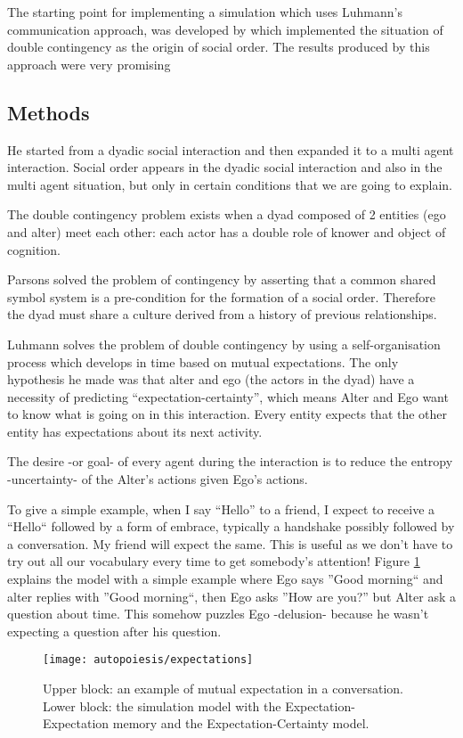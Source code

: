 The starting point for implementing a simulation which uses Luhmann's communication approach, 
was developed by \citet{SocialOrderScalability} which implemented the situation of
double contingency as the origin of social order.
The results produced by this approach were very promising


\subsection{Methods}
He started from a dyadic social interaction and then expanded it to a multi agent interaction.
Social order appears in the dyadic social interaction and also in the multi agent situation,
but only in certain conditions that we are going to explain.

The double contingency problem exists when a dyad composed of 2 entities (ego and alter) meet each other:
each actor has a double role of knower and object of cognition.

Parsons solved the problem of contingency by asserting that a common shared symbol system
is a pre-condition for the formation of a social order.
Therefore the dyad must share a culture derived from a history of previous relationships.

Luhmann solves the problem of double contingency by using a self-organisation process which
develops in time based on mutual expectations.
The only hypothesis he made was that alter and ego (the actors in the dyad) have a
necessity of predicting ``expectation-certainty'', which means Alter and Ego want to know what
is going on in this interaction.
Every entity expects that the other entity has expectations about its next activity.

The desire -or goal- of every agent during the interaction is to reduce the entropy -uncertainty- of the
Alter's actions given Ego's actions.

To give a simple example, when I say ``Hello'' to a friend, I expect to receive a ``Hello`` followed by
a form of embrace, typically a handshake possibly followed by a conversation. My friend will expect the same.
This is useful as we don't have to try out all our vocabulary every time to get somebody's attention!
Figure \ref{Fig:Dittrich:Model} explains the model with a simple example where
Ego says ''Good morning`` and alter replies with ''Good morning``, then Ego
asks ''How are you?'' but Alter ask a question about time.
This somehow puzzles Ego -delusion- because he wasn't expecting a question after
his question.
\begin{figure}[htbp]
\begin{center}
\texttt{[image: autopoiesis/expectations]}
\end{center}
\small{
\caption[Expectations and communication structures]{
Upper block: an example of mutual expectation in a conversation.
Lower block: the simulation model with the Expectation-Expectation memory
and the Expectation-Certainty model.
\label{Fig:Dittrich:Model}}}
\end{figure}

